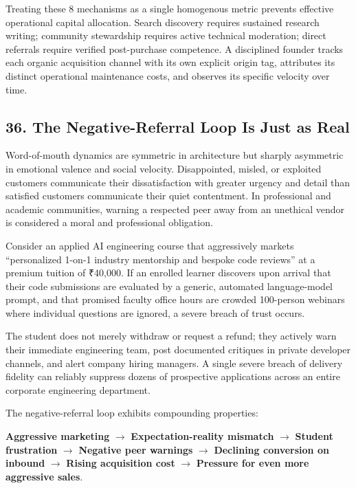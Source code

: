 Treating these 8 mechanisms as a single homogenous metric prevents effective operational capital allocation. Search discovery requires sustained research writing; community stewardship requires active technical moderation; direct referrals require verified post-purchase competence. A disciplined founder tracks each organic acquisition channel with its own explicit origin tag, attributes its distinct operational maintenance costs, and observes its specific velocity over time.

\subsection*{36. The Negative-Referral Loop Is Just as Real}

Word-of-mouth dynamics are symmetric in architecture but sharply asymmetric in emotional valence and social velocity. Disappointed, misled, or exploited customers communicate their dissatisfaction with greater urgency and detail than satisfied customers communicate their quiet contentment. In professional and academic communities, warning a respected peer away from an unethical vendor is considered a moral and professional obligation.

Consider an applied AI engineering course that aggressively markets ``personalized 1-on-1 industry mentorship and bespoke code reviews'' at a premium tuition of ₹40,000. If an enrolled learner discovers upon arrival that their code submissions are evaluated by a generic, automated language-model prompt, and that promised faculty office hours are crowded 100-person webinars where individual questions are ignored, a severe breach of trust occurs. 

The student does not merely withdraw or request a refund; they actively warn their immediate engineering team, post documented critiques in private developer channels, and alert company hiring managers. A single severe breach of delivery fidelity can reliably suppress dozens of prospective applications across an entire corporate engineering department.

The negative-referral loop exhibits compounding properties:
\begin{center}
\textbf{Aggressive marketing} $\longrightarrow$ \textbf{Expectation-reality mismatch} $\longrightarrow$ \textbf{Student frustration} $\longrightarrow$ \textbf{Negative peer warnings} $\longrightarrow$ \textbf{Declining conversion on inbound} $\longrightarrow$ \textbf{Rising acquisition cost} $\longrightarrow$ \textbf{Pressure for even more aggressive sales}.
\end{center}

